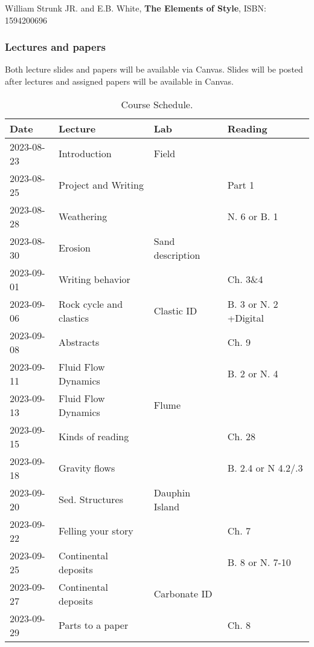 \documentclass[11pt,]{article}
\begin{document}
William Strunk JR. and E.B. White, \textbf{The Elements of Style}, ISBN:
1594200696

\hypertarget{lectures-and-papers}{%
\subsubsection{Lectures and papers}\label{lectures-and-papers}}

Both lecture slides and papers will be available via Canvas. Slides will
be posted after lectures and assigned papers will be available in
Canvas.

\newpage

\begin{table}

\caption{\label{tab:Schedule}Course Schedule.}
\centering
\begin{tabular}[t]{l|>{\raggedright\arraybackslash}p{5cm}|>{\raggedright\arraybackslash}p{5cm}|>{\raggedright\arraybackslash}p{5cm}}
\hline
Date & Lecture & Lab & Reading\\
\hline
2023-08-23 & Introduction & Field & \\
\hline
2023-08-25 & Project and Writing &  & Part 1\\
\hline
2023-08-28 & Weathering &  & N. 6 or B. 1\\
\hline
2023-08-30 & Erosion & Sand description & \\
\hline
2023-09-01 & Writing behavior &  & Ch. 3\&4\\
\hline
2023-09-06 & Rock cycle and clastics & Clastic ID & B. 3 or N. 2 +Digital\\
\hline
2023-09-08 & Abstracts &  & Ch. 9\\
\hline
2023-09-11 & Fluid Flow Dynamics &  & B. 2 or N. 4\\
\hline
2023-09-13 & Fluid Flow Dynamics & Flume & \\
\hline
2023-09-15 & Kinds of reading &  & Ch. 28\\
\hline
2023-09-18 & Gravity flows &  & B. 2.4 or N 4.2/.3\\
\hline
2023-09-20 & Sed. Structures & Dauphin Island & \\
\hline
2023-09-22 & Felling your story &  & Ch. 7\\
\hline
2023-09-25 & Continental deposits &  & B. 8 or N. 7-10\\
\hline
2023-09-27 & Continental deposits & Carbonate ID & \\
\hline
2023-09-29 & Parts to a paper &  & Ch. 8\\

\end{tabular}
\end{table}
\end{document}
